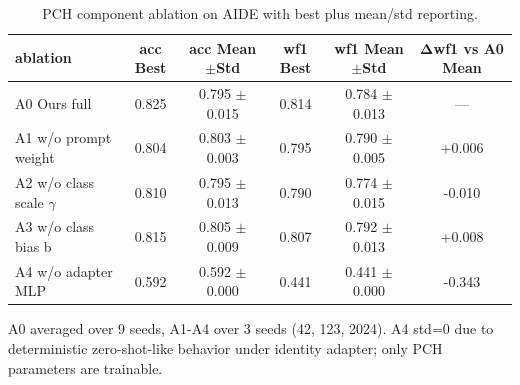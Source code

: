 \begin{table}[t]
\centering
\small
\begin{tabular}{lccccc}
\toprule
ablation & acc Best & acc Mean$\pm$Std & wf1 Best & wf1 Mean$\pm$Std & Δwf1 vs A0 Mean \\
\midrule
A0 Ours full & 0.825 & 0.795 $\pm$ 0.015 & 0.814 & 0.784 $\pm$ 0.013 & --- \\
A1 w/o prompt weight & 0.804 & 0.803 $\pm$ 0.003 & 0.795 & 0.790 $\pm$ 0.005 & +0.006 \\
A2 w/o class scale $\gamma$ & 0.810 & 0.795 $\pm$ 0.013 & 0.790 & 0.774 $\pm$ 0.015 & -0.010 \\
A3 w/o class bias b & 0.815 & 0.805 $\pm$ 0.009 & 0.807 & 0.792 $\pm$ 0.013 & +0.008 \\
A4 w/o adapter MLP & 0.592 & 0.592 $\pm$ 0.000 & 0.441 & 0.441 $\pm$ 0.000 & -0.343 \\
\bottomrule
\end{tabular}
\vspace{2pt}\footnotesize A0 averaged over 9 seeds, A1-A4 over 3 seeds (42, 123, 2024). A4 std=0 due to deterministic zero-shot-like behavior under identity adapter; only PCH parameters are trainable.
\caption{PCH component ablation on AIDE with best plus mean/std reporting.}
\label{tab:aide_pch_ablation}
\end{table}
